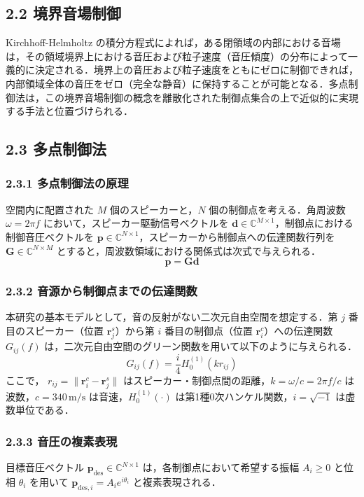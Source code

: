 \documentclass[11pt, a4paper]{article}
\begin{document}
\subsection{2.2 境界音場制御}
Kirchhoff-Helmholtz の積分方程式によれば，ある閉領域の内部における音場は，その領域境界上における音圧および粒子速度（音圧傾度）の分布によって一義的に決定される．境界上の音圧および粒子速度をともにゼロに制御できれば，内部領域全体の音圧をゼロ（完全な静音）に保持することが可能となる．多点制御法は，この境界音場制御の概念を離散化された制御点集合の上で近似的に実現する手法と位置づけられる．

\subsection{2.3 多点制御法}
\subsubsection{2.3.1 多点制御法の原理}
空間内に配置された $M$ 個のスピーカーと，$N$ 個の制御点を考える．角周波数 $\omega = 2\pi f$ において，スピーカー駆動信号ベクトルを $\mathbf{d} \in \mathbb{C}^{M \times 1}$，制御点における制御音圧ベクトルを $\mathbf{p} \in \mathbb{C}^{N \times 1}$，スピーカーから制御点への伝達関数行列を $\mathbf{G} \in \mathbb{C}^{N \times M}$ とすると，周波数領域における関係式は次式で与えられる．
\begin{equation}
\mathbf{p} = \mathbf{G} \mathbf{d}
\end{equation}

\subsubsection{2.3.2 音源から制御点までの伝達関数}
本研究の基本モデルとして，音の反射がない二次元自由空間を想定する．第 $j$ 番目のスピーカー（位置 $\mathbf{r}_j^s$）から第 $i$ 番目の制御点（位置 $\mathbf{r}_i^c$）への伝達関数 $G_{ij}(f)$ は，二次元自由空間のグリーン関数を用いて以下のように与えられる．
\begin{equation}
G_{ij}(f) = \frac{i}{4} H_0^{(1)}(k r_{ij})
\end{equation}
ここで， $r_{ij} = \|\mathbf{r}_i^c - \mathbf{r}_j^s\|$ はスピーカー・制御点間の距離，$k = \omega / c = 2\pi f / c$ は波数，$c = 340\,\mathrm{m/s}$ は音速，$H_0^{(1)}(\cdot)$ は第1種0次ハンケル関数，$i = \sqrt{-1}$ は虚数単位である．

\subsubsection{2.3.3 音圧の複素表現}
目標音圧ベクトル $\mathbf{p}_{\mathrm{des}} \in \mathbb{C}^{N \times 1}$ は，各制御点において希望する振幅 $A_i \ge 0$ と位相 $\theta_i$ を用いて $\mathbf{p}_{\mathrm{des}, i} = A_i e^{i \theta_i}$ と複素表現される．
\end{document}
